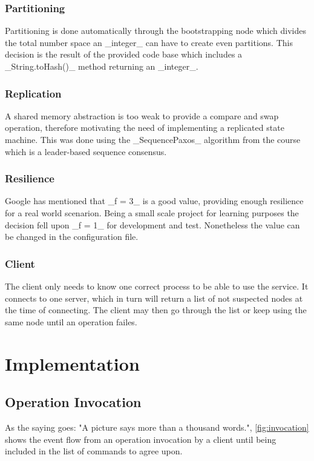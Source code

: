 \documentclass[a4paper]{scrartcl}
\begin{document}
\subsubsection{Partitioning}
Partitioning is done automatically through the bootstrapping node which divides the total number space an _integer_ can have to create even partitions. 
This decision is the result of the provided code base which includes a _String.toHash()_ method returning an _integer_.

\subsubsection{Replication}
A shared memory abstraction is too weak to provide a compare and swap operation, therefore motivating the need of implementing a replicated state machine.
This was done using the _SequencePaxos_ algorithm from the course which is a leader-based sequence consensus.

\subsubsection{Resilience}
Google has mentioned that  _f = 3_ is a good value, providing enough resilience for a real world scenarion.
Being a small scale project for learning purposes the decision fell upon _f = 1_ for development and test.
Nonetheless the value can be changed in the configuration file.

\subsubsection{Client}
The client only needs to know one correct process to be able to use the service.
It connects to one server, which in turn will return a list of not suspected nodes at the time of connecting.
The client may then go through the list or keep using the same node until an operation failes.




\section{Implementation}


\subsection{Operation Invocation}
As the saying goes: "A picture says more than a thousand words.", \ref{fig:invocation} shows the event flow from an operation invocation by a client until being included in the list of commands to agree upon.
\end{document}
